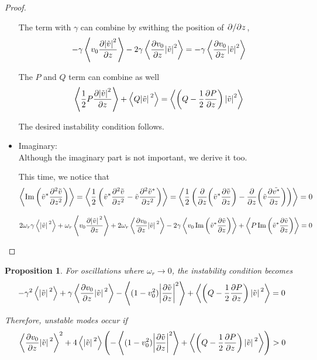 \documentclass{article}
\theoremstyle{plain}
\newtheorem{proposition}{Proposition}
\theoremstyle{definition}
\theoremstyle{remark}
\theoremstyle{remark}
\begin{document}
\begin{proof}
\begin{itemize}
    The term with $\gamma$ can combine by swithing the position of $\pdv*{z}$,
    \[ - \gamma\expval{v_0 \pdv{\abs{\tilde{v}}^2}{z}} 
    - 2\gamma\expval{\pdv{v_0}{z}\abs{\tilde{v}}^2}
    = - \gamma\expval{\pdv{v_0}{z}\abs{\tilde{v}}^2} \]

    The $P$ and $Q$ term can combine as well
    \[ \expval{\frac{1}{2}P\pdv{\abs{\tilde{v}}^2}{z}}
    + \expval{Q\abs*{\tilde{v}}^2}
    = \expval{ \left(Q - \frac{1}{2}\pdv{P}{z}\right)\abs{\tilde{v}}^2 } \]

    The desired instability condition follows.

    \item Imaginary: \\ 
    Although the imaginary part is not important, we derive it too.

    This time, we notice that 
    \[ \expval{ \Im\left(\tilde{v}^*\pdv[2]{\tilde{v}}{z}\right) } 
    = \expval{\frac{1}{2}\left(\tilde{v}^*\pdv[2]{\tilde{v}}{z} - \tilde{v}\pdv[2]{\tilde{v}^*}{z}\right)}
    = \expval{\frac{1}{2}\left( \pdv{z}(\tilde{v}^*\pdv{\tilde{v}}{z}) - \pdv{z}(\tilde{v}\pdv{\tilde{v^*}}{z}) \right)}
    = 0 \]

    \[
        2\omega_r\gamma \expval{\abs*{\tilde{v}}^2} 
        + \omega_r\expval{v_0\pdv{\abs*{\tilde{v}}^2}{z}}
        + 2\omega_r\expval{\pdv{v_0}{z}\abs*{\tilde{v}}^2}
        - 2\gamma \expval{v_0\Im\left(\tilde{v}^*\pdv{\tilde{v}}{z}\right)}
        + \expval{P\Im\left(\tilde{v}^*\pdv{\tilde{v}}{z}\right)} = 0
    \]
\end{itemize}
\end{proof}

\begin{proposition}
    For oscillations where $\omega_r\to 0$, the instability condition becomes
    \[ -\gamma^2 \expval{\abs*{\tilde{v}}^2} 
    + \gamma\expval{\pdv{v_0}{z}\abs*{\tilde{v}}^2} 
    - \expval{(1-v_0^2)\abs{\pdv{\tilde{v}}{z}}^2 }
    + \expval{\left(Q-\frac{1}{2}\pdv{P}{z}\right)\abs*{\tilde{v}}^2} = 0 \]
    
    Therefore, unstable modes occur if 
    \[ \expval{\pdv{v_0}{z}\abs*{\tilde{v}}^2}^2 + 4\expval{\abs*{\tilde{v}}^2}\left( - \expval{(1-v_0^2)\abs{\pdv{\tilde{v}}{z}}^2 }
    + \expval{\left(Q-\frac{1}{2}\pdv{P}{z}\right)\abs*{\tilde{v}}^2} \right) > 0   \]
\end{proposition}


\newpage
\end{document}
